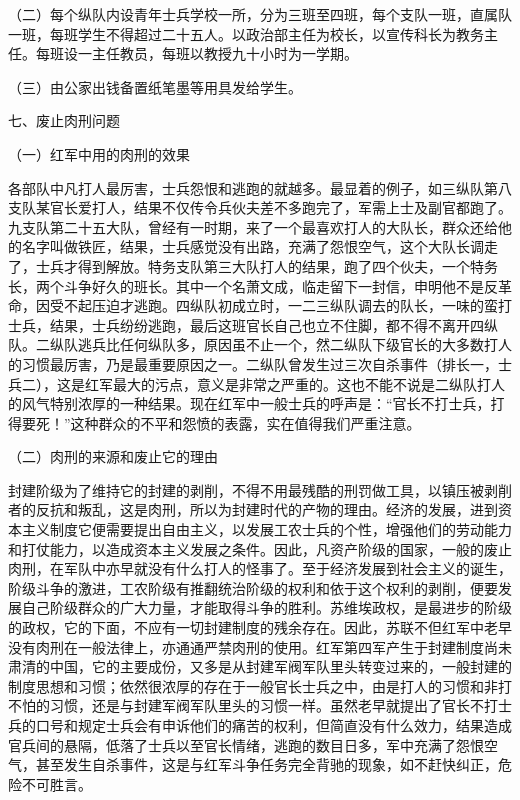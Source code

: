 （二）每个纵队内设青年士兵学校一所，分为三班至四班，每个支队一班，直属队一班，每班学生不得超过二十五人。以政治部主任为校长，以宣传科长为教务主任。每班设一主任教员，每班以教授九十小时为一学期。

（三）由公家出钱备置纸笔墨等用具发给学生。

七、废止肉刑问题

（一）红军中用的肉刑的效果

各部队中凡打人最厉害，士兵怨恨和逃跑的就越多。最显着的例子，如三纵队第八支队某官长爱打人，结果不仅传令兵伙夫差不多跑完了，军需上士及副官都跑了。九支队第二十五大队，曾经有一时期，来了一个最喜欢打人的大队长，群众还给他的名字叫做铁匠，结果，士兵感觉没有出路，充满了怨恨空气，这个大队长调走了，士兵才得到解放。特务支队第三大队打人的结果，跑了四个伙夫，一个特务长，两个斗争好久的班长。其中一个名萧文成，临走留下一封信，申明他不是反革命，因受不起压迫才逃跑。四纵队初成立时，一二三纵队调去的队长，一味的蛮打士兵，结果，士兵纷纷逃跑，最后这班官长自己也立不住脚，都不得不离开四纵队。二纵队逃兵比任何纵队多，原因虽不止一个，然二纵队下级官长的大多数打人的习惯最厉害，乃是最重要原因之一。二纵队曾发生过三次自杀事件（排长一，士兵二），这是红军最大的污点，意义是非常之严重的。这也不能不说是二纵队打人的风气特别浓厚的一种结果。现在红军中一般士兵的呼声是：“官长不打士兵，打得要死！”这种群众的不平和怨愤的表露，实在值得我们严重注意。

（二）肉刑的来源和废止它的理由

封建阶级为了维持它的封建的剥削，不得不用最残酷的刑罚做工具，以镇压被剥削者的反抗和叛乱，这是肉刑，所以为封建时代的产物的理由。经济的发展，进到资本主义制度它便需要提出自由主义，以发展工农士兵的个性，增强他们的劳动能力和打仗能力，以造成资本主义发展之条件。因此，凡资产阶级的国家，一般的废止肉刑，在军队中亦早就没有什么打人的怪事了。至于经济发展到社会主义的诞生，阶级斗争的激进，工农阶级有推翻统治阶级的权利和依于这个权利的剥削，便要发展自己阶级群众的广大力量，才能取得斗争的胜利。苏维埃政权，是最进步的阶级的政权，它的下面，不应有一切封建制度的残余存在。因此，苏联不但红军中老早没有肉刑在一般法律上，亦通通严禁肉刑的使用。红军第四军产生于封建制度尚未肃清的中国，它的主要成份，又多是从封建军阀军队里头转变过来的，一般封建的制度思想和习惯；依然很浓厚的存在于一般官长士兵之中，由是打人的习惯和非打不怕的习惯，还是与封建军阀军队里头的习惯一样。虽然老早就提出了官长不打士兵的口号和规定士兵会有申诉他们的痛苦的权利，但简直没有什么效力，结果造成官兵间的悬隔，低落了士兵以至官长情绪，逃跑的数目日多，军中充满了怨恨空气，甚至发生自杀事件，这是与红军斗争任务完全背驰的现象，如不赶快纠正，危险不可胜言。

